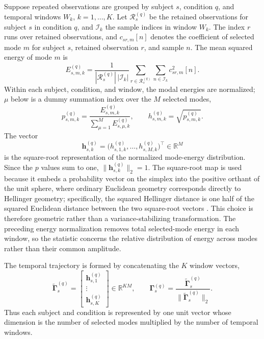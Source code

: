 \documentclass[12pt]{article}
\newcommand{\R}{\mathbb{R}}
\begin{document}
Suppose repeated observations are grouped by subject $s$, condition $q$, and temporal windows $W_k$, $k=1,\ldots,K$. Let $\mathcal R_s^{(q)}$ be the retained observations for subject $s$ in condition $q$, and $\mathcal I_k$ the sample indices in window $W_k$. The index $r$ runs over retained observations, and $c_{sr,m}[n]$ denotes the coefficient of selected mode $m$ for subject $s$, retained observation $r$, and sample $n$. The mean squared energy of mode $m$ is
\begin{equation}
E_{s,m,k}^{(q)}=
\frac{1}{|\mathcal R_s^{(q)}|\,|\mathcal I_k|}
\sum_{r\in\mathcal R_s^{(q)}}\sum_{n\in\mathcal I_k} c_{sr,m}^2[n].
\label{eq:modeenergy}
\end{equation}
Within each subject, condition, and window, the modal energies are normalized; $\mu$ below is a dummy summation index over the $M$ selected modes,
\begin{equation}
p_{s,m,k}^{(q)}=\frac{E_{s,m,k}^{(q)}}{\sum_{\mu=1}^{M}E_{s,\mu,k}^{(q)}},
\qquad
h_{s,m,k}^{(q)}=\sqrt{p_{s,m,k}^{(q)}}.
\label{eq:hellinger}
\end{equation}
The vector
\[
\bm h_{s,k}^{(q)}=\big(h_{s,1,k}^{(q)},\ldots,h_{s,M,k}^{(q)}\big)^{\top}\in\R^M
\]
is the square-root representation of the normalized mode-energy distribution. Since the $p$ values sum to one, $\|\bm h_{s,k}^{(q)}\|_2=1$. The square-root map is used because it embeds a probability vector on the simplex into the positive orthant of the unit sphere, where ordinary Euclidean geometry corresponds directly to Hellinger geometry; specifically, the squared Hellinger distance is one half of the squared Euclidean distance between the two square-root vectors \citep{Amari2016}. This choice is therefore geometric rather than a variance-stabilizing transformation. The preceding energy normalization removes total selected-mode energy in each window, so the statistic concerns the relative distribution of energy across modes rather than their common amplitude.

The temporal trajectory is formed by concatenating the $K$ window vectors,
\begin{equation}
\widetilde{\bm\Gamma}_s^{(q)}=
\begin{bmatrix}
\bm h_{s,1}^{(q)}\\
\vdots\\
\bm h_{s,K}^{(q)}
\end{bmatrix}\in\R^{KM},
\qquad
\bm\Gamma_s^{(q)}=
\frac{\widetilde{\bm\Gamma}_s^{(q)}}{\|\widetilde{\bm\Gamma}_s^{(q)}\|_2}.
\label{eq:trajectory}
\end{equation}
Thus each subject and condition is represented by one unit vector whose dimension is the number of selected modes multiplied by the number of temporal windows.
\end{document}
